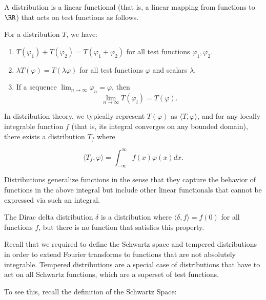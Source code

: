 \documentclass[11pt]{article}
\begin{document}
\begin{definition} \label{def:Distribution}
    \item A distribution is a linear functional (that is, a linear mapping from functions to $\RR$) that acts on test functions as follows.

    For a distribution $T$, we have:

    \begin{enumerate}
        \item $T(\varphi_1) + T(\varphi_2) = T(\varphi_1 + \varphi_2)$ for all test functions $\varphi_1, \varphi_2$.
        \item $\lambda T(\varphi) = T(\lambda \varphi)$ for all test functions $\varphi$ and scalars $\lambda$.
        \item If a sequence $\lim_{n \rightarrow \infty} \varphi_n = \varphi$, then
        $$\lim_{n \rightarrow \infty} T(\varphi_i) = T(\varphi).$$
    \end{enumerate}

\end{definition}


    
In distribution theory, we typically represent $T(\varphi)$ as $\langle T, \varphi\rangle$, and for any locally integrable function $f$ (that is, its integral converges on any bounded domain), there exists a distribution $T_f$ where

$$\langle T_f, \varphi\rangle = \int_{-\infty}^\infty f(x) \varphi(x) dx.$$

Distributions generalize functions in the sense that they capture the behavior of functions in the above integral but include other linear functionals that cannot be expressed via such an integral.

\begin{example}
\label{ex:dirac}
    The Dirac delta distribution $\delta$ is a distribution where $\langle \delta, f\rangle = f(0)$ for all functions $f$, but there is no function that satisfies this property.
\end{example}

Recall that we required to define the Schwartz space and tempered distributions in order to extend Fourier transforms to functions that are not absolutely integrable. Tempered distributions are a special case of distributions that have to act on all Schwartz functions, which are a superset of test functions.

To see this, recall the definition of the Schwartz Space:
\end{document}
